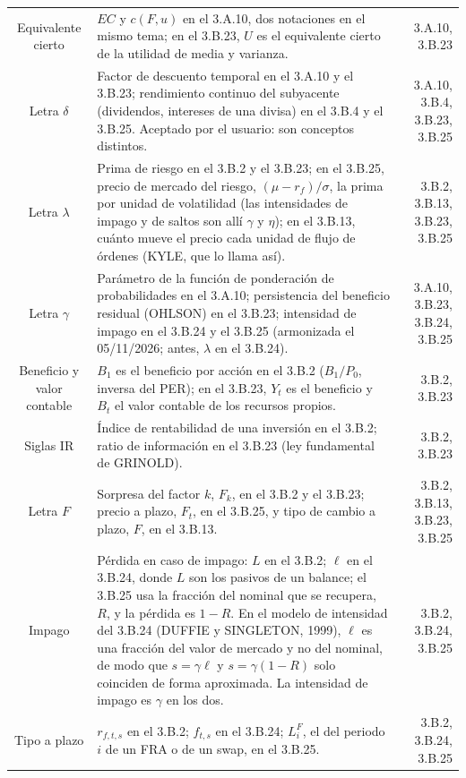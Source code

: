 \documentclass[10pt,a4paper]{article}
\begin{document}
\begin{longtable}{SMD}
Equivalente cierto & $EC$ y $c(F,u)$ en el 3.A.10, dos notaciones en el mismo tema; en el 3.B.23, $U$ es el equivalente cierto de la utilidad de media y varianza. & 3.A.10, 3.B.23\\
Letra $\delta$ & Factor de descuento temporal en el 3.A.10 y el 3.B.23; rendimiento continuo del subyacente (dividendos, intereses de una divisa) en el 3.B.4 y el 3.B.25. Aceptado por el usuario: son conceptos distintos. & 3.A.10, 3.B.4, 3.B.23, 3.B.25\\
Letra $\lambda$ & Prima de riesgo en el 3.B.2 y el 3.B.23; en el 3.B.25, precio de mercado del riesgo, $(\mu-r_f)/\sigma$, la prima por unidad de volatilidad (las intensidades de impago y de saltos son allí $\gamma$ y $\eta$); en el 3.B.13, cuánto mueve el precio cada unidad de flujo de órdenes (KYLE, que lo llama así). & 3.B.2, 3.B.13, 3.B.23, 3.B.25\\
Letra $\gamma$ & Parámetro de la función de ponderación de probabilidades en el 3.A.10; persistencia del beneficio residual (OHLSON) en el 3.B.23; intensidad de impago en el 3.B.24 y el 3.B.25 (armonizada el 05/11/2026; antes, $\lambda$ en el 3.B.24). & 3.A.10, 3.B.23, 3.B.24, 3.B.25\\
Beneficio y valor contable & $B_1$ es el beneficio por acción en el 3.B.2 ($B_1/P_0$, inversa del PER); en el 3.B.23, $Y_t$ es el beneficio y $B_t$ el valor contable de los recursos propios. & 3.B.2, 3.B.23\\
Siglas IR & Índice de rentabilidad de una inversión en el 3.B.2; ratio de información en el 3.B.23 (ley fundamental de GRINOLD). & 3.B.2, 3.B.23\\
Letra $F$ & Sorpresa del factor $k$, $F_k$, en el 3.B.2 y el 3.B.23; precio a plazo, $F_t$, en el 3.B.25, y tipo de cambio a plazo, $F$, en el 3.B.13. & 3.B.2, 3.B.13, 3.B.23, 3.B.25\\
Impago & Pérdida en caso de impago: $L$ en el 3.B.2; $\ell$ en el 3.B.24, donde $L$ son los pasivos de un balance; el 3.B.25 usa la fracción del nominal que se recupera, $R$, y la pérdida es $1-R$. En el modelo de intensidad del 3.B.24 (DUFFIE y SINGLETON, 1999), $\ell$ es una fracción del valor de mercado y no del nominal, de modo que $s=\gamma\ell$ y $s=\gamma(1-R)$ solo coinciden de forma aproximada. La intensidad de impago es $\gamma$ en los dos. & 3.B.2, 3.B.24, 3.B.25\\
Tipo a plazo & $r_{f,t,s}$ en el 3.B.2; $f_{t,s}$ en el 3.B.24; $L^F_i$, el del periodo $i$ de un FRA o de un swap, en el 3.B.25. & 3.B.2, 3.B.24, 3.B.25\\

\end{longtable}
\end{document}
